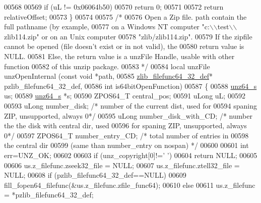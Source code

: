 \begin{DoxyCode}
00568 
00569     \textcolor{keywordflow}{if} (uL != 0x06064b50)
00570         \textcolor{keywordflow}{return} 0;
00571 
00572     \textcolor{keywordflow}{return} relativeOffset;
00573 \}
00574 
00575 \textcolor{comment}{/*}
00576 \textcolor{comment}{  Open a Zip file. path contain the full pathname (by example,}
00577 \textcolor{comment}{     on a Windows NT computer "c:\(\backslash\)\(\backslash\)test\(\backslash\)\(\backslash\)zlib114.zip" or on an Unix computer}
00578 \textcolor{comment}{     "zlib/zlib114.zip".}
00579 \textcolor{comment}{     If the zipfile cannot be opened (file doesn't exist or in not valid), the}
00580 \textcolor{comment}{       return value is NULL.}
00581 \textcolor{comment}{     Else, the return value is a unzFile Handle, usable with other function}
00582 \textcolor{comment}{       of this unzip package.}
00583 \textcolor{comment}{*/}
00584 local unzFile unzOpenInternal (\textcolor{keyword}{const} \textcolor{keywordtype}{void} *path,
00585                                \hyperlink{structzlib__filefunc64__32__def__s}{zlib\_filefunc64\_32\_def}* pzlib\_filefunc64\_32\_def,
00586                                \textcolor{keywordtype}{int} is64bitOpenFunction)
00587 \{
00588     \hyperlink{structunz64__s}{unz64\_s} us;
00589     \hyperlink{structunz64__s}{unz64\_s} *s;
00590     ZPOS64\_T central\_pos;
00591     uLong   uL;
00592 
00593     uLong number\_disk;          \textcolor{comment}{/* number of the current dist, used for}
00594 \textcolor{comment}{                                   spaning ZIP, unsupported, always 0*/}
00595     uLong number\_disk\_with\_CD;  \textcolor{comment}{/* number the the disk with central dir, used}
00596 \textcolor{comment}{                                   for spaning ZIP, unsupported, always 0*/}
00597     ZPOS64\_T number\_entry\_CD;      \textcolor{comment}{/* total number of entries in}
00598 \textcolor{comment}{                                   the central dir}
00599 \textcolor{comment}{                                   (same than number\_entry on nospan) */}
00600 
00601     \textcolor{keywordtype}{int} err=UNZ\_OK;
00602 
00603     \textcolor{keywordflow}{if} (unz\_copyright[0]!=\textcolor{charliteral}{' '})
00604         \textcolor{keywordflow}{return} NULL;
00605 
00606     us.z\_filefunc.zseek32\_file = NULL;
00607     us.z\_filefunc.ztell32\_file = NULL;
00608     \textcolor{keywordflow}{if} (pzlib\_filefunc64\_32\_def==NULL)
00609         fill\_fopen64\_filefunc(&us.z\_filefunc.zfile\_func64);
00610     \textcolor{keywordflow}{else}
00611         us.z\_filefunc = *pzlib\_filefunc64\_32\_def;

\end{DoxyCode}
